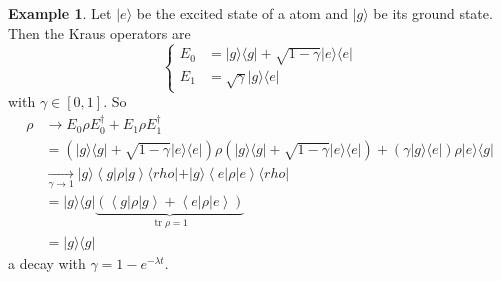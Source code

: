 \documentclass[12pt]{book}
\theoremstyle{definition}
\newtheorem*{example}{\bfseries Example}
\newcommand{\scalar}[1]{\left\langle {#1}\right\rangle}
\let\shortto\to
\renewcommand{\to}{\longrightarrow}
\newcommand{\para}[1]{\left( {#1} \right)}
\newcommand{\bra}[1]{\langle {#1} \vert}
\newcommand{\ket}[1]{\vert {#1} \rangle}
\DeclareMathOperator{\tr}{tr}
\begin{document}
\begin{example}
Let $\ket{e}$ be the excited state of a atom and $\ket{g}$ be its ground state. Then the Kraus operators are
\begin{equation*}
  \begin{cases}
    E_0 & = \ket{g}\bra{g} + \sqrt{1 - \gamma} \ket{e} \bra{e} \\
    E_1 & = \sqrt{\gamma} \ket{g}\bra{e}
  \end{cases}
\end{equation*}
with $\gamma \in [0, 1]$. So
\begin{align*}
  \rho & \to E_0 \rho E_0^\dagger + E_1 \rho E_1^\dagger \\
  & = \para{\ket{g} \bra{g} + \sqrt{1 - \gamma} \ket{e} \bra{e}} \rho \para{\ket{g} \bra{g} + \sqrt{1 - \gamma} \ket{e} \bra{e}} +   \para{\gamma \ket{g}\bra{e}} \rho \ket{e}\bra{g} \\
  & \underset{\gamma \shortto 1}{\to} \ket{g}\scalar{g \vert \rho \vert g} \bra{rho} + \ket{g}\scalar{e \vert \rho \vert e} \bra{rho} \\
  & = \ket{g}\bra{g} \underbrace{\para{\scalar{g \vert \rho \vert g} + \scalar{e \vert \rho \vert e}}}_{\tr \rho = 1} \\
  & = \ket{g}\bra{g}
\end{align*}
a decay with $\gamma = 1 - e^{-\lambda t}$.
\end{example}
\end{document}
